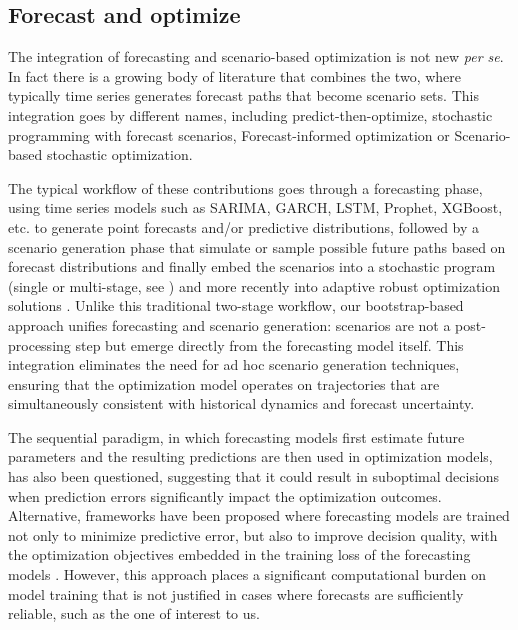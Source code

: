 \documentclass[preprint,11pt,authoryear]{elsarticle}
\begin{document}
\subsection{Forecast and optimize}

The integration of forecasting and scenario-based optimization is not new {\it per se}. In fact there is a growing body of literature that combines the two, where typically time series generates forecast paths that become scenario sets.
This integration goes by different names, including predict-then-optimize, stochastic programming with forecast scenarios, Forecast-informed optimization or Scenario-based stochastic optimization.

The typical workflow of these contributions goes through a forecasting phase, using time series models such as SARIMA, GARCH, LSTM, Prophet, XGBoost, etc. to generate point forecasts and/or predictive distributions, followed by a scenario generation phase that simulate or sample possible future paths based on forecast distributions and finally embed the scenarios into a stochastic program (single or multi-stage, see \citealt{R18,FTW18,BK19}) and more recently into adaptive robust optimization solutions \citep{BB23}. Unlike this traditional two-stage workflow, our bootstrap-based approach unifies forecasting and scenario generation: scenarios are not a post-processing step but emerge directly from the forecasting model itself. This integration eliminates the need for ad hoc scenario generation techniques, ensuring that the optimization model operates on trajectories that are simultaneously consistent with historical dynamics and forecast uncertainty. 

The sequential paradigm, in which forecasting models first estimate future parameters and the resulting predictions are then used in optimization models, has also been questioned, suggesting that it could result in suboptimal decisions when prediction errors significantly impact the optimization outcomes. Alternative, frameworks have been proposed where forecasting models are trained not only to minimize predictive error, but also to improve decision quality, with the optimization objectives embedded in the training loss of the forecasting models \citep{DAK17,WDT19}. However, this approach places a significant computational burden on model training that is not justified in cases where forecasts are sufficiently reliable, such as the one of interest to us.
\end{document}
